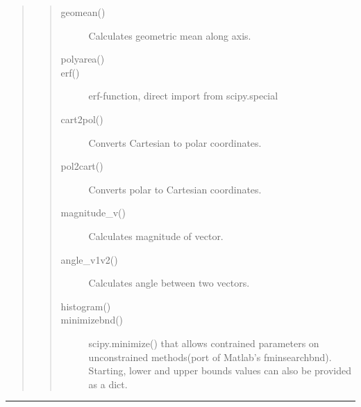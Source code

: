 \documentclass[letterpaper,10pt,english]{sphinxmanual}
\begin{document}
\begin{quote}
\begin{quote}
\begin{description}
\item[{geomean()}] \leavevmode
Calculates geometric mean along axis.

\item[{polyarea()}] \leavevmode
{}

\item[{erf()}] \leavevmode
erf-function, direct import from scipy.special

\item[{cart2pol()}] \leavevmode
Converts Cartesian to polar coordinates.

\item[{pol2cart()}] \leavevmode
Converts polar to Cartesian coordinates.

\item[{magnitude\_v()}] \leavevmode
Calculates magnitude of vector.

\item[{angle\_v1v2()}] \leavevmode
Calculates angle between two vectors.

\item[{histogram()}] \leavevmode
{}

\item[{minimizebnd()}] \leavevmode
scipy.minimize() that allows contrained parameters on 
unconstrained methods(port of Matlab’s fminsearchbnd). 
Starting, lower and upper bounds values can also be provided 
as a dict.

\end{description}\end{quote}
\end{quote}


\bigskip\hrule\bigskip

\end{document}
